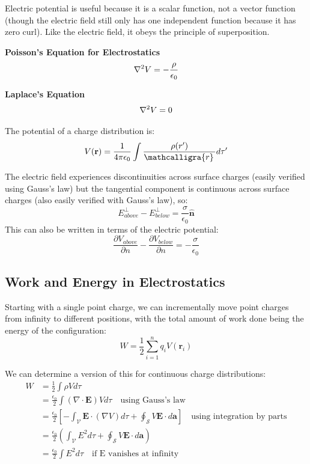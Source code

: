 \documentclass{article}
\newcommand{\scriptr}{\mathcalligra{r}\,}
\begin{document}
Electric potential is useful because it is a scalar function, not a vector function (though the electric field still only has one 
independent function because it has zero curl). Like the electric field, it obeys the principle of superposition.

\begin{definition}{\textbf{Poisson's Equation for Electrostatics}}
    \[
        \laplacian{V}=-\frac{\rho }{\epsilon_0}
    \]
\end{definition}

\begin{definition}{\textbf{Laplace's Equation}}
    \[
        \laplacian{V}=0
    \]
\end{definition}

The potential of a charge distribution is:
\[
    V(\mathbf{r} )=\frac{1}{4 \pi \epsilon_0}\int \frac{\rho(r^{\prime})}{\scriptr}d \tau^{\prime} 
\]

The electric field experiences discontinuities across surface charges (easily verified using Gauss's law) but the tangential 
component is continuous across surface charges (also easily verified with Gauss's law), so:
\[
    E_{above}^{\perp}-E_{below}^{\perp}=\frac{\sigma }{\epsilon_0}\mathbf{\hat{n}} 
\]
This can also be written in terms of the electric potential:
\[
    \frac{\partial V_{above}}{\partial n}-\frac{\partial V_{below}}{\partial n}=-\frac{\sigma }{\epsilon_0}
\]

\subsection{Work and Energy in Electrostatics}
Starting with a single point charge, we can incrementally move point charges from infinity to different positions, with the total amount of work 
done being the energy of the configuration:
\[
    W=\frac{1}{2}\sum_{i=1}^{n}q_iV(\mathbf{r}_i)
\]

We can determine a version of this for continuous charge distributions:
\begin{align*}
    W&=\frac{1}{2}\int \rho V d \tau \\
    &= \frac{\epsilon_0}{2}\int(\nabla \cdot \mathbf{E} )V d \tau  \quad \text{using Gauss's law} \\
    &=\frac{\epsilon_0}{2}[-\int_{\mathscr{V}}\mathbf{E} \cdot (\nabla V)d \tau +\oint_{\mathscr{S}}V \mathbf{E}\cdot d \mathbf{a} ] \quad \text{using integration by parts} \\
    &=\frac{\epsilon_0}{2}(\int_{\mathscr{V}}E^2 d \tau +\oint_{\mathscr{S}}V \mathbf{E} \cdot d \mathbf{a} ) \\
    &=\frac{\epsilon_0}{2}\int E^2 d \tau  \quad \text{if E vanishes at infinity}
\end{align*}
\end{document}
